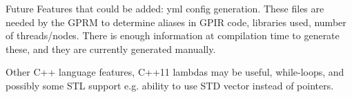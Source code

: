 
Future Features that could be added:
    yml config generation.
    These files are needed by the GPRM to determine aliases in GPIR code, libraries used,
    number of threads/nodes. There is enough information at compilation time to generate these,
    and they are currently generated manually. 

    Other C++ language features, C++11 lambdas may be useful,
    while-loops, and possibly some STL support e.g. ability to use STD vector instead of pointers.


